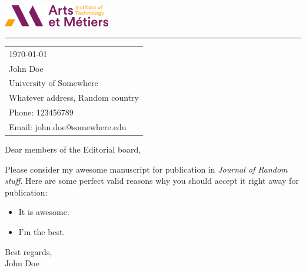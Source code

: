 \documentclass{article}
\begin{document}

\includegraphics[width=0.35\textwidth]{logo.png} %

\vspace{-1em} %

\rule{\linewidth}{1pt} %

\bigskip\bigskip %


\hfill
\begin{tabular}{l @{}}
	\today \bigskip\\ %
	John Doe\\
	University of Somewhere \\ %
	Whatever address, Random country \\
	Phone: 123456789  \\
	Email: john.doe@somewhere.edu
\end{tabular}

\bigskip %



Dear members of the Editorial board,

Please consider my awesome manuscript for publication in \emph{Journal of Random stuff}.
Here are some perfect valid reasons why you should accept it right away for publication:
\begin{itemize}
\item It is awesome.
\item I'm the best.
\end{itemize}

\begin{flushright}
  Best regards, \\
  John Doe
\end{flushright}
\end{document}
